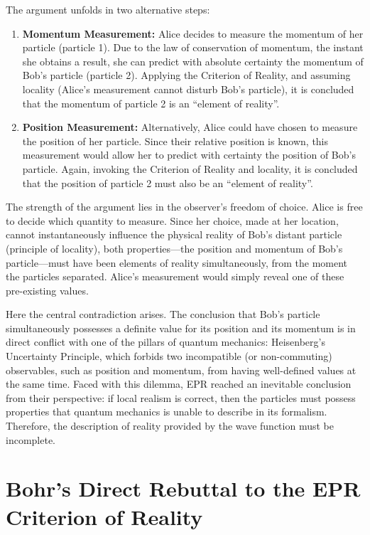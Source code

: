 The argument unfolds in two alternative steps:
\begin{enumerate}
    \item \textbf{Momentum Measurement:} Alice decides to measure the momentum of her particle (particle 1). Due to the law of conservation of momentum, the instant she obtains a result, 
    she can predict with absolute certainty the momentum of Bob's particle (particle 2). Applying the Criterion of Reality, and assuming locality (Alice's measurement cannot disturb Bob's 
    particle), it is concluded that the momentum of particle 2 is an ``element of reality''.

    \item \textbf{Position Measurement:} Alternatively, Alice could have chosen to measure the position of her particle. Since their relative position is known, this measurement would allow 
    her to predict with certainty the position of Bob's particle. Again, invoking the Criterion of Reality and locality, it is concluded that the position of particle 2 must also be an 
    ``element of reality''.
\end{enumerate}

The strength of the argument lies in the observer's freedom of choice. Alice is free to decide which quantity to measure. Since her choice, made at her location, cannot instantaneously 
influence the physical reality of Bob's distant particle (principle of locality), both properties—the position and momentum of Bob's particle—must have been elements of reality simultaneously, 
from the moment the particles separated. Alice's measurement would simply reveal one of these pre-existing values.

Here the central contradiction arises. The conclusion that Bob's particle simultaneously possesses a definite value for its position and its momentum is in direct conflict with one of the
pillars of quantum mechanics: Heisenberg's Uncertainty Principle, which forbids two incompatible (or non-commuting) observables, such as position and momentum, from having well-defined values 
at the same time. Faced with this dilemma, EPR reached an inevitable conclusion from their perspective: if local realism is correct, then the particles must possess properties that quantum 
mechanics is unable to describe in its formalism. Therefore, the description of reality provided by the wave function must be incomplete.

\section{Bohr's Direct Rebuttal to the EPR Criterion of Reality}

